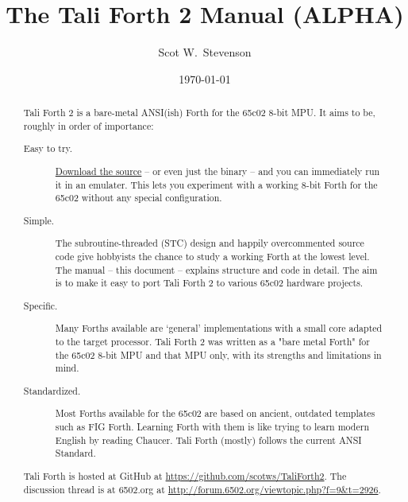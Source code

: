 \documentclass[a4paper,notitlepage]{report}
\title{The Tali Forth 2 Manual (ALPHA)}
\author{Scot W.~Stevenson}
\date{\today}
\begin{document}
\maketitle

\begin{abstract}
        Tali Forth 2 is a bare-metal ANSI(ish) Forth for the 65c02 8-bit MPU. 
        It aims to be, roughly in order of importance: 

        \begin{description}

        \item [Easy to try.]
                \href{https://github.com/scotws/TaliForth2}{Download the source}
                -- or even just the binary -- and you can immediately
                run it in an emulater. This lets you experiment with a
                working 8-bit Forth for the 65c02 without any special
                configuration.

        \item [Simple.] The subroutine-threaded (STC) design and happily
                overcommented source code give hobbyists the chance to study a
                working Forth at the lowest level. The manual -- this
                document -- explains structure and code in detail. The aim
                is to make it easy to port Tali Forth 2
                to various 65c02 hardware projects.

        \item [Specific.] Many Forths available are `general' implementations with
                a small core adapted to the target processor. Tali Forth 2 was
                written as a "bare metal Forth" for the 65c02 8-bit MPU
                and that MPU only, with its strengths and limitations in
                mind.

        \item [Standardized.] Most Forths available for the 65c02 are based on ancient,
                outdated templates such as FIG Forth. Learning Forth with them is like
                trying to learn modern English by reading Chaucer. Tali
                Forth (mostly) follows the current ANSI Standard.
\end{description}

        Tali Forth is hosted at GitHub at
        \href{https://github.com/scotws/TaliForth2}{https://github.com/scotws/TaliForth2}. 
        The discussion thread is at 6502.org at
        \href{http://forum.6502.org/viewtopic.php?f=9\&t=2926}{http://forum.6502.org/viewtopic.php?f=9\&t=2926}.
        
\end{abstract}
\end{document}

